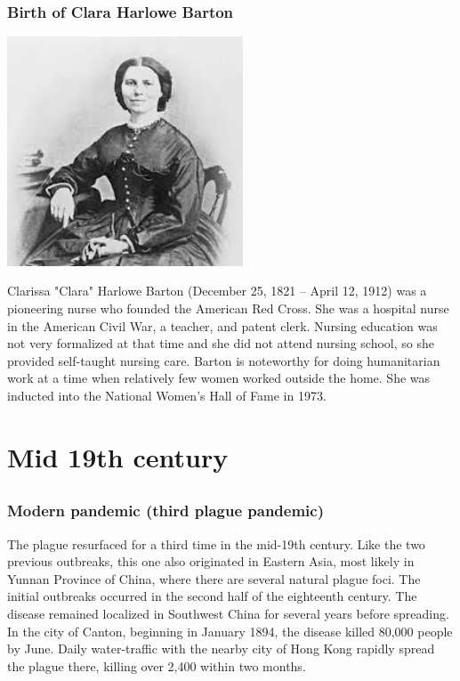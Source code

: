 \documentclass[11pt]{report}
\begin{document}
\subsection{Birth of Clara Harlowe Barton}
\vspace{2mm}\begin{center}\includegraphics[width=7cm]{./img/claraBarton.jpg}\end{center}
Clarissa "Clara" Harlowe Barton (December 25, 1821 – April 12, 1912) was a pioneering nurse who founded the American Red Cross. She was a hospital nurse in the American Civil War, a teacher, and patent clerk. Nursing education was not very formalized at that time and she did not attend nursing school, so she provided self-taught nursing care. Barton is noteworthy for doing humanitarian work at a time when relatively few women worked outside the home. She was inducted into the National Women's Hall of Fame in 1973.

\chapter{Mid 19th century}
\section{}
\subsection{Modern pandemic (third plague pandemic)}
The plague resurfaced for a third time in the mid-19th century. Like the two previous outbreaks, this one also originated in Eastern Asia, most likely in Yunnan Province of China, where there are several natural plague foci. The initial outbreaks occurred in the second half of the eighteenth century. The disease remained localized in Southwest China for several years before spreading. In the city of Canton, beginning in January 1894, the disease killed 80,000 people by June. Daily water-traffic with the nearby city of Hong Kong rapidly spread the plague there, killing over 2,400 within two months.
\end{document}
